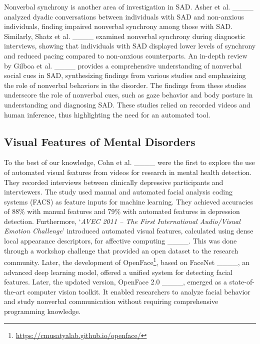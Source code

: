Nonverbal synchrony is another area of investigation in SAD. Asher et al. ____ analyzed dyadic conversations between individuals with SAD and non-anxious individuals, finding impaired nonverbal synchrony among those with SAD. Similarly, Shatz et al. ____ examined nonverbal synchrony during diagnostic interviews, showing that individuals with SAD displayed lower levels of synchrony and reduced pacing compared to non-anxious counterparts. An in-depth review by Gilboa et al. ____ provides a comprehensive understanding of nonverbal social cues in SAD, synthesizing findings from various studies and emphasizing the role of nonverbal behaviors in the disorder. The findings from these studies underscore the role of nonverbal cues, such as gaze behavior and body posture in understanding and diagnosing SAD. These studies relied on recorded videos and human inference, thus highlighting the need for an automated tool.

\subsection{Visual Features of Mental Disorders}
To the best of our knowledge, Cohn et al. ____ were the first to explore the use of automated visual features from videos for research in mental health detection. They recorded interviews between clinically depressive participants and interviewers. The study used manual and automated facial analysis coding systems (FACS) as feature inputs for machine learning. They achieved accuracies of 88\% with manual features and 79\% with automated features in depression detection. Furthermore, `\textit{AVEC 2011 – The First International Audio/Visual Emotion Challenge}' introduced automated visual features, calculated using dense local appearance descriptors, for affective computing ____. This was done through a workshop challenge that provided an open dataset to the research community. Later, the development of OpenFace\footnote{\url{https://cmusatyalab.github.io/openface/}}, based on FaceNet ____, an advanced deep learning model, offered a unified system for detecting facial features. Later, the updated version, OpenFace 2.0 ____, emerged as a state-of-the-art computer vision toolkit. It enabled researchers to analyze facial behavior and study nonverbal communication without requiring comprehensive programming knowledge.

